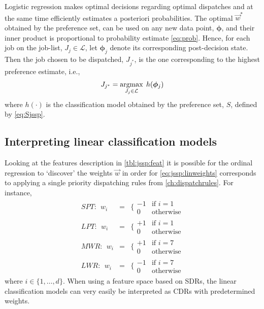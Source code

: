 \documentclass[smallextended]{svjour3}
\renewcommand{\vphi}{\bm \phi}
\begin{document}
Logistic regression makes optimal decisions regarding optimal dispatches and at 
the same time efficiently estimates a posteriori probabilities. The optimal 
$\vec{w}^*$ obtained by the preference set, can be used on any new data point, 
$\vphi$, and their inner product is proportional to probability estimate 
\cref{eq:prob}. Hence, for each job on the job-list, $J_j\in\mathcal{L}$, let 
$\vphi_j$ denote its corresponding  post-decision state. Then the job chosen to 
be dispatched, $J_{j^*}$, is the one corresponding to the highest preference 
estimate, i.e.,
\begin{equation}\label{eq:lin}
    J_{j^*}=\argmax_{J_j\in \mathcal{L}}\; h(\vphi_j)
\end{equation}
where $h(\cdot)$ is the classification model obtained by the preference set, 
$S$, defined by \eqref{eq:Sjssp}. 

\subsection{Interpreting linear classification 
models}\label{sec:learningmodels:interpret}
Looking at the features description in \cref{tbl:jssp:feat} it is possible for 
the ordinal regression to `discover' the weights $\vec{w}$ in order for 
\eqref{eq:jssp:linweights} corresponds to applying a single priority 
dispatching rules from \cref{ch:dispatchrules}. For instance, 
\begin{eqnarray*} %
    SPT:~~w_i&=&\bigg\{ \begin{array}{rl}-1&\text{if 
    }i=1\\0&\text{otherwise}\end{array} \\
    LPT:~~w_i&=&\bigg\{ \begin{array}{rl}+1&\text{if 
    }i=1\\0&\text{otherwise}\end{array} \\
    MWR:~~w_i&=&\bigg\{ \begin{array}{rl}+1&\text{if 
    }i=7\\0&\text{otherwise}\end{array} \\
    LWR:~~w_i&=&\bigg\{ \begin{array}{rl}-1&\text{if 
    }i=7\\0&\text{otherwise}\end{array}
\end{eqnarray*}
where $i\in\{1,\ldots,d\}$. %
When using a feature space based on SDRs, the linear classification models can 
very easily be interpreted as CDRs with predetermined weights.
\end{document}
